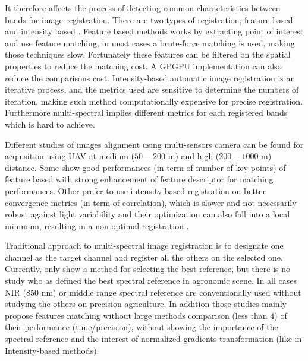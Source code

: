 \documentclass[a4paper,twoside]{article}
\begin{document}
	It therefore affects the process of detecting common characteristics between bands for image registration.
	There are two types of registration, feature based and intensity based \cite{Zitova}.
	Feature based methods works by extracting point of interest and use feature matching, in most cases a brute-force matching is used, making those techniques slow.
	Fortunately these features can be filtered on the spatial properties to reduce the matching cost. A GPGPU implementation can also reduce the comparisons cost.
	Intensity-based automatic image registration is an iterative process, and the metrics used are sensitive to determine the numbers of iteration,
	making such method computationally expensive for precise registration. Furthermore multi-spectral implies different metrics for each registered bands which is hard to achieve.
	\\
	\par Different studies of images alignment using multi-sensors camera can be found for acquisition using UAV at medium ($50-200$ m) and high ($200-1000$ m) distance.
	Some show good performances (in term of number of key-points) of feature based \cite{DantasDiasJunior, Vakalopoulou}
	with strong enhancement of feature descriptor for matching performances.
	Other prefer to use intensity based registration \cite{douarre:hal-02183837} on better convergence metrics \cite{8118101} (in term of correlation),
	which is slower and not necessarily robust against light variability and their optimization can also fall into a local minimum,
	resulting in a non-optimal registration \cite{Vioix2004ConceptionER}.
	\\
	\par Traditional approach to multi-spectral image registration is to designate one channel as
	the target channel and register all the others on the selected one.
	Currently, only \cite{DantasDiasJunior} show a method for selecting the best reference,
	but there is no study who as defined the best spectral reference in agronomic scene.
	In all cases NIR (850 nm) or middle range spectral reference are conventionally used without studying the others on precision agriculture.
	In addition those studies mainly propose features matching without large methods comparison \cite{DantasDiasJunior}(less than 4) of their performance (time/precision),
	without showing the importance of the spectral reference and the interest of normalized gradients transformation (like in Intensity-based methods).
\end{document}
